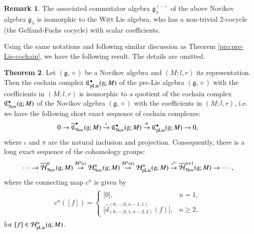 \documentclass[12pt]{amsart}
\theoremstyle{definition}
\newtheorem{thm}{Theorem}[section]
\newtheorem{rmk}[thm]{Remark}
\newcommand{\g}{\mathfrak g}
\newcommand{\huaH}{\mathcal{H}}
\newcommand{\frkC}{\mathfrak C}
\newcommand{\nov}{{\rm Nov}}
\newcommand{\pl}{{\rm pLie}}
\begin{document}
\begin{rmk}
The associated commutator algebra $\g_\lambda^{(-)}$ of the above Novikov algebra $\g_\lambda $
is isomorphic to the Witt Lie algebra, who has a non-trivial 2-cocycle
(the Gelfand-Fuchs cocycle) with scalar coefficients.
\end{rmk}

Using the same notations and following similar discussion as Theorem \ref{pro:pre-Lie-cochain}, we have the following result. The details are omitted.

\begin{thm}
  	Let $(\g,\diamond)$ be a Novikov algebra and $(M;l,r)$ its representation. Then the cochain complex $\frkC_{\pl}^\bullet(\g;M)$ of the pre-Lie algebra $(\g,\diamond)$ with the coefficients in $(M;l,r)$ is isomorphic to a quotient  of the cochain complex  $\frkC_{\nov}^\bullet(\g;M)$ of the Novikov algebra $(\g,\diamond)$ with the coefficients in $(M;l,r)$, i.e. we have the following short exact sequence of cochain complexes:
\begin{equation}
0 \to \overline{\frkC}_{\nov}^\bullet(\g;M) \stackrel{\iota}{\to}  {\frkC}_{\nov}^\bullet(\g;M) \stackrel{\pi}{\to} \frkC_{\pl}^\bullet(\g;M) \to 0,
\end{equation}
where $\iota$ and $\pi$ are the natural inclusion and projection. Consequently, there is a long exact sequence of the cohomology groups:
\begin{equation}
\cdots \to \overline{\huaH}^n_\nov(\g;M)   \stackrel{ \huaH^n(\iota)}{\to}  \huaH^n_\nov(\g;M) \stackrel{ \huaH^n(\pi)}{\to} \huaH^n_\pl(\g;M)   \stackrel{ c^n}{\to}   \overline{\huaH}^{n+1}_\nov(\g;M) \to\cdots,
\end{equation}
where the connecting map $c^n$ is given by
\begin{align*}
	\begin{split}
		c^n([f])= \left \{
		\begin{array}{ll}
			{[}0],                    & n=1,\\
			{[}\hat{d}_{(0,\cdots,0,1,n-2,2)}^{(0,\cdots,0,n-1,1)}(f)],     & n\geq 2,
		\end{array}
		\right.
	\end{split}
\end{align*}
for $[f]\in \huaH^n_\pl(\g;M)$.
\end{thm}
\end{document}
